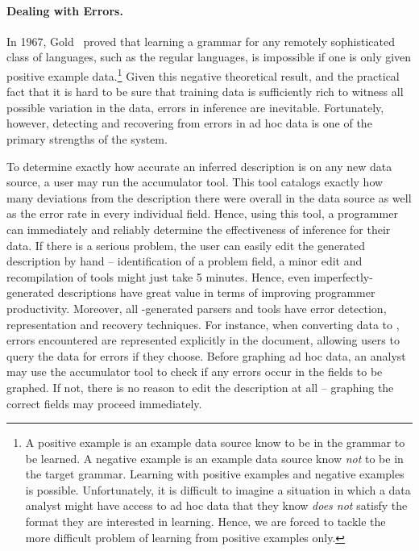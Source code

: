 
\paragraph*{Dealing with Errors.}  
In 1967, Gold~\cite{gold:inference}
proved that learning a grammar for any remotely
sophisticated class of languages, such as the regular languages, 
is impossible if one is only given positive 
example data.\footnote{A positive example is an example data source
know to be in the grammar to be learned.  
A negative example is an example data source
know {\em not} to be in the target grammar.
Learning with positive examples and negative examples is possible.
Unfortunately, it is difficult to imagine a situation in which a
data analyst might have access to ad hoc data that they know {\em does not}
satisfy the format they are interested in learning.  Hence,
we are forced to tackle the more difficult problem of learning from 
positive examples only.}
Given this negative theoretical result, and the practical fact
that it is hard to be sure that training data
is sufficiently rich to witness all possible variation in the data,
errors in inference are inevitable.  Fortunately, however, detecting
and recovering from errors in ad hoc data is one of the primary strengths
of the \pads{} system.  

To determine exactly how accurate an
inferred description is on any new data source, a user may run the
accumulator tool.  This tool catalogs exactly how many deviations
from the description there were overall in the data source
as well as the error rate in every individual field.
Hence, using this tool, a programmer can immediately and reliably
determine the effectiveness of inference for their data.
If there is a serious 
problem, the user can easily edit the generated description by hand
-- identification of a problem field, a minor
edit and recompilation of tools might just take 5 minutes.  Hence,
even imperfectly-generated descriptions have great value in terms of
improving programmer productivity.  Moreover, all \pads{}-generated 
parsers and tools
have error detection, representation and recovery techniques.
For instance, when converting data to \xml{}, errors encountered
are represented explicitly in the \xml{} document, allowing users to query
the data for errors if they choose.  Before graphing ad hoc data,
an analyst may use the accumulator tool to check if any errors occur
in the fields to be graphed.  If not, there is no reason to edit
the description at all -- graphing the correct fields may proceed 
immediately.

